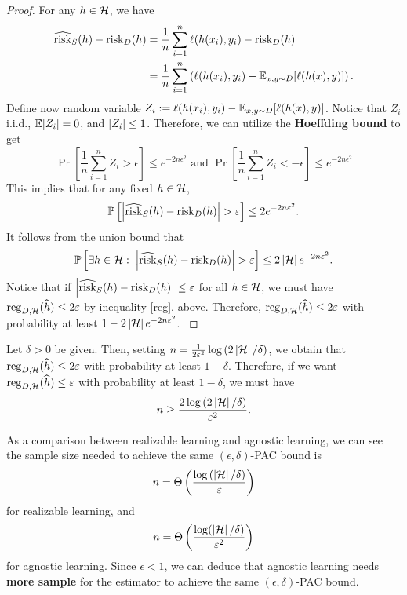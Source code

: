 \documentclass[a4paper]{article}
\begin{document}
\begin{proof}
{  For any $h \in \mathcal{H}$, we have
  \[
  \begin{aligned}
    \widehat{\operatorname{risk}}_S (h) - \operatorname{risk}_D(h) 
    &= \frac{1}{n} \sum_{i=1}^n \ell(h(x_i), y_i) 
    - \operatorname{risk}_D (h) \\
    &= \frac{1}{n} \sum_{i=1}^n \left( 
      \ell(h(x_i), y_i) - \mathbb{E}_{x, y \sim D} 
      [\ell(h(x), y)]
     \right).
  \end{aligned}
  \]
  Define now random variable $Z_i := \ell(h(x_i), y_i) - 
  \mathbb{E}_{x, y \sim D} [\ell(h(x), y)]$. Notice that $Z_i$ 
  i.i.d., $\mathbb{E}[Z_i] = 0$, and $\left\lvert Z_i\right\rvert \leq 1$. Therefore, 
  we can utilize the \textbf{Hoeffding bound} to get 
  \[
  \Pr \left[ \frac{1}{n} \sum_{i=1}^n Z_i > \epsilon \right]
  \leq e^{- 2 n \epsilon^2} \text{ and }
  \Pr \left[ \frac{1}{n} \sum_{i=1}^n Z_i < -\epsilon \right]
  \leq e^{- 2 n \epsilon^2}
  \]
  This implies that for any fixed $h \in \mathcal{H}$,  
  \[
  \mathbb{P} \left[ \left\lvert \widehat{\operatorname{risk}}_S(h) - \operatorname{risk}_D(h)\right\rvert > \varepsilon 
  \right] \leq 2 e^{-2 n \varepsilon^2}.
  \]
  It follows from the union bound that 
  \[
  \mathbb{P} \left[ \exists h \in \mathcal{H}: \; 
  \left\lvert \widehat{\operatorname{risk}}_S(h) - \operatorname{risk}_D(h)\right\rvert > \varepsilon \right] 
  \leq 2 \left\lvert \mathcal{H}\right\rvert e^{- 2 n \varepsilon^2}.
  \]
  Notice that if  
  $\left\lvert \widehat{\operatorname{risk}}_S (h) - \operatorname{risk}_D (h)\right\rvert \leq \varepsilon$
  for all $h \in \mathcal{H}$, we must have $\operatorname{reg}_{D, \mathcal{H}} 
  (\widehat{h}) \leq 2 \varepsilon$ by inequality \eqref{reg}.
  above. Therefore,
  $\operatorname{reg}_{D, \mathcal{H}} (\widehat{h}) \leq 2 \varepsilon$ with probability at least 
  $1 - 2 \left\lvert \mathcal{H}\right\rvert e^{- 2 n \varepsilon^2}$. 
}
\end{proof}

\begin{cor}
Let $\delta > 0$ be given. Then, 
setting 
$n = \frac{1}{2\varepsilon^2} \log \left( 2 \left\lvert \mathcal{H}\right\rvert / 
\delta \right)$, we obtain that $\operatorname{reg}_{D, \mathcal{H}} (\widehat{h})
\leq 2\varepsilon$ with probability at least $1 - \delta$.
Therefore, if we want $\operatorname{reg}_{D, \mathcal{H}} 
(\widehat{h}) \leq \varepsilon$ with probability at least $1 - 
\delta$, we must have 
\[
  n \geq \frac{2 \log 
  \left( 2 \left\lvert \mathcal{H}\right\rvert / \delta \right)}
  {\varepsilon^2}.
\]
\end{cor}

As a comparison between realizable learning and agnostic 
learning, we can see the sample size needed to 
achieve the same $(\epsilon, \delta)$-PAC bound is 
\[
n = \Theta \left( \frac{\log \left( \left\lvert \mathcal{H}\right\rvert / \delta
\right)}{\varepsilon} \right)
\]
for realizable learning, and 
\[
n = \Theta \left( \frac{\log(\left\lvert \mathcal{H}\right\rvert / \delta)}{\varepsilon^2} 
\right)
\]
for agnostic learning. Since $\epsilon < 1$, 
we can deduce that agnostic learning needs 
\textbf{more sample} for the estimator to achieve the 
same $(\epsilon, \delta)$-PAC bound.
\end{document}
